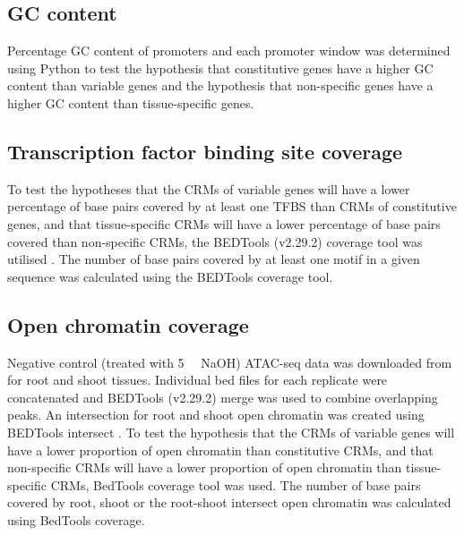 \documentclass[../main.tex]{subfiles}
\begin{document}
\subsection{GC content}\label{chapter2:methods:gc-content}

Percentage GC content of promoters and each promoter window was determined using Python to test the hypothesis that constitutive genes have a higher GC content than variable genes and the hypothesis that non\hyp{}specific genes have a higher GC content than tissue\hyp{}specific genes.


\subsection{Transcription factor binding site coverage}{\label{chapter2:methods:transcription-factor-binding-site-coverage}}

To test the hypotheses that the CRMs of variable genes will have a lower percentage of base pairs covered by at least one TFBS than CRMs of constitutive genes, and that tissue\hyp{}specific CRMs will have a lower percentage of base pairs covered than non\hyp{}specific CRMs, the BEDTools (v2.29.2) coverage tool was utilised \autocite{quinlanBEDToolsFlexibleSuite2010}.
The number of base pairs covered by at least one motif in a given sequence was calculated using the BEDTools coverage tool.

\subsection{Open chromatin coverage}\label{chapter2:methods:open-chromatin-coverage}
Negative control (treated with \SI{5}{\micro\Molar} NaOH) ATAC\hyp{}seq data was downloaded from \textcite{potterCytokininModulatesContextdependent2018} for root and shoot tissues.
Individual bed files for each replicate were concatenated and BEDTools (v2.29.2) merge \autocite{quinlanBEDToolsFlexibleSuite2010} was used to combine overlapping peaks.
An intersection for root and shoot open chromatin was created using BEDTools intersect \autocite{quinlanBEDToolsFlexibleSuite2010}.
To test the hypothesis that the CRMs of variable genes will have a lower proportion of open chromatin than constitutive CRMs, and that non\hyp{}specific CRMs will have a lower proportion of open chromatin than tissue\hyp{}specific CRMs, BedTools coverage tool \autocite{quinlanBEDToolsFlexibleSuite2010} was used.
The number of base pairs covered by root, shoot or the root\hyp{}shoot intersect open chromatin was calculated using BedTools coverage.
\end{document}
